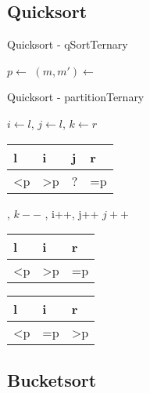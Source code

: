 \documentclass[18pt]{beamer}
\begin{document}
\subsection{Quicksort}
\begin{frame}[fragile]{Quicksort - qSortTernary}
\begin{algorithmic}
   \Return \EndIf
  \State $p \gets $ 
  \State $(m,m') \gets $ 
  \State {}
  \State {}
 \EndProcedure
\end{algorithmic}

\end{frame}

\begin{frame}[fragile]{Quicksort - partitionTernary}
\small
\begin{algorithmic}
  \State $i \gets l$, $j \gets l$, $k \gets r$
  \State \Comment \begin{tabular}{|l|l|l|l|}
	  \hline
	  l & i & j & r \\	  \hline
           \textless p & \textgreater  p & ? & =p \\
           \hline
         \end{tabular}
     , $k--$
     , i++, j++
    \Else \text{ } $j++$
    \EndIf
  \EndWhile
  \State \Comment \begin{tabular}{|l|l|l|}
	  \hline
	  l & i  & r \\	  \hline
           \textless p & \textgreater  p & =p \\
           \hline
         \end{tabular}
     
    \Else \text{ } 
    \EndIf
      \State \Comment \begin{tabular}{|l|l|l|}
	  \hline
	  l & i  & r \\	  \hline
           \textless p & =p & \textgreater  p \\
           \hline
         \end{tabular}
 \EndFunction
\end{algorithmic}

\end{frame}

\subsection{Bucketsort}
\end{document}
